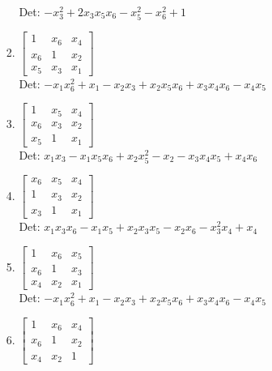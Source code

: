 \documentclass[12pt]{article}
\begin{document}
\begin{enumerate}
\begin{enumerate}
\begin{enumerate}
Det: $- x_{3}^{2} + 2 x_{3} x_{5} x_{6} - x_{5}^{2} - x_{6}^{2} + 1$\\


\item $\displaystyle \left[\begin{matrix}1 & x_{6} & x_{4}\\x_{6} & 1 & x_{2}\\x_{5} & x_{3} & x_{1}\end{matrix}\right]$\\

Det: $- x_{1} x_{6}^{2} + x_{1} - x_{2} x_{3} + x_{2} x_{5} x_{6} + x_{3} x_{4} x_{6} - x_{4} x_{5}$\\


\item $\displaystyle \left[\begin{matrix}1 & x_{5} & x_{4}\\x_{6} & x_{3} & x_{2}\\x_{5} & 1 & x_{1}\end{matrix}\right]$\\

Det: $x_{1} x_{3} - x_{1} x_{5} x_{6} + x_{2} x_{5}^{2} - x_{2} - x_{3} x_{4} x_{5} + x_{4} x_{6}$\\


\item $\displaystyle \left[\begin{matrix}x_{6} & x_{5} & x_{4}\\1 & x_{3} & x_{2}\\x_{3} & 1 & x_{1}\end{matrix}\right]$\\

Det: $x_{1} x_{3} x_{6} - x_{1} x_{5} + x_{2} x_{3} x_{5} - x_{2} x_{6} - x_{3}^{2} x_{4} + x_{4}$\\


\item $\displaystyle \left[\begin{matrix}1 & x_{6} & x_{5}\\x_{6} & 1 & x_{3}\\x_{4} & x_{2} & x_{1}\end{matrix}\right]$\\

Det: $- x_{1} x_{6}^{2} + x_{1} - x_{2} x_{3} + x_{2} x_{5} x_{6} + x_{3} x_{4} x_{6} - x_{4} x_{5}$\\


\item $\displaystyle \left[\begin{matrix}1 & x_{6} & x_{4}\\x_{6} & 1 & x_{2}\\x_{4} & x_{2} & 1\end{matrix}\right]$\\


\end{enumerate}
\end{enumerate}
\end{enumerate}
\end{document}
